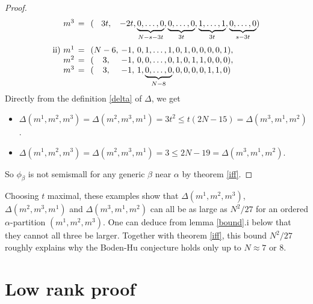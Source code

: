 \documentclass{article}
\begin{document}
\begin{proof}
\begin{displaymath}
\begin{array}{r@{\hspace{1ex}=\hspace{1ex}(}c@{\,}c@{\,}l}
      m^3 &  3t,  & -2t,  & \underbrace{0,\ldots,0}_{N-s-3t}, \underbrace{0,\ldots,0}_{3t}, \underbrace{1,\ldots,1}_{3t}, \underbrace{0,\ldots,0}_{s-3t})
     \medskip \\ \text{ii) }
      m^1 & N-6,  &  -1,  & 0,             1, \ldots, 1       , 0, 1, 0, 0, 0, 0, 1),\\
      m^2 &  3,   &  -1,  & 0,             0, \ldots, 0       , 1, 0, 1, 1, 0, 0, 0),\\
      m^3 &  3,   &  -1,  & 1, \underbrace{0, \ldots, 0}_{N-8}, 0, 0, 0, 0, 1, 1, 0)
    \end{array}
  \end{displaymath}
  Directly from the definition \ref{delta} of $\Delta$, we get
  \begin{itemize}
   \item[i)] $\Delta(m^1, m^2, m^3) = \Delta(m^2, m^3, m^1) = 3 t^2 \leq t(2N-15) = \Delta(m^3, m^1, m^2)$.
   \item[ii)] $\Delta(m^1, m^2, m^3) = \Delta(m^2, m^3, m^1) = 3 \leq 2N-19 = \Delta(m^3, m^1, m^2)$.
  \end{itemize}
  So $\phi_{\beta}$ is not semismall for any generic $\beta$ near $\alpha$ by theorem \ref{iff}.
\end{proof}

\begin{rem}
  Choosing $t$ maximal, these examples show that $\Delta(m^1, m^2, m^3)$, $\Delta(m^2, m^3, m^1)$ and $\Delta(m^3, m^1, m^2)$ can all be as large as
  $N^2/27$ for an ordered $\alpha$-partition $(m^1, m^2, m^3)$. One can deduce from lemma \ref{bound}.i below that they cannot all three be larger.
  Together with theorem \ref{iff}, this bound $N^2/27$ roughly explains why the Boden-Hu conjecture holds only up to $N \approx 7$ or $8$.
\end{rem}


\section{Low rank proof} \label{positive}
\end{document}
